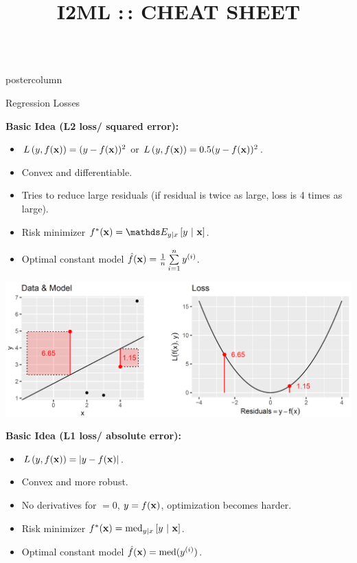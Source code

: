 \documentclass{beamer}
\title{I2ML :\,: CHEAT SHEET} %
\newlength{\columnheight} %
\begin{document}
\begin{frame}[fragile]{}
\begin{columns}
	\begin{column}{.31\textwidth}
		\begin{beamercolorbox}[center]{postercolumn}
			\begin{minipage}{.98\textwidth}
				\parbox[t][\columnheight]{\textwidth}{
					\begin{myblock}{Regression Losses}
						\begin{codebox}
			\textbf{Basic Idea (L2 loss/ squared error):}
						\end{codebox}
						
						\begin{itemize}[$\bullet$]     
						\setlength{\itemindent}{+.3in}
              \item $L\left(y, f(\mathbf{x})\right) = (y-f(\mathbf{x}))^2$ or $L\left(y, f(\mathbf{x})\right) = 0.5 (y-f(\mathbf{x}))^2$.
              \item Convex and differentiable.
              \item Tries to reduce large residuals (if residual is twice as large, loss is 4 times as large).
              \item Risk minimizer $\fxbayes = \E_{y|x} \left[y ~|~ \xv \right]$.
              \item Optimal constant model $\hat{f}(\mathbf{x}) = \frac{1}{n} \sum\limits_{i=1}^n y^{(i)}$.
            \end{itemize}

            \vspace*{1ex}
            \includegraphics[width=0.8\columnwidth]{img/reg_loss.PNG}

\begin{codebox}
\textbf{Basic Idea (L1 loss/ absolute error):}
\end{codebox}

\begin{itemize}[$\bullet$]     \setlength{\itemindent}{+.3in}
\item $L\left(y, f(\mathbf{x})\right) = |y-f(\mathbf{x})|$.
\item Convex and more robust.
\item No derivatives for $ = 0$, $y = f(\mathbf{x})$, optimization becomes harder.
\item Risk minimizer $f^{\ast}(\mathbf{x}) = \text{med}_{y|x} \left[y ~|~ \mathbf{x} \right]$.
\item Optimal constant model $\hat{f}(\mathbf{x}) = \text{med}(y^{(i)})$.
  \end{itemize}


\end{myblock}}
\end{minipage}
\end{beamercolorbox}
\end{column}
\end{columns}
\end{frame}
\end{document}
